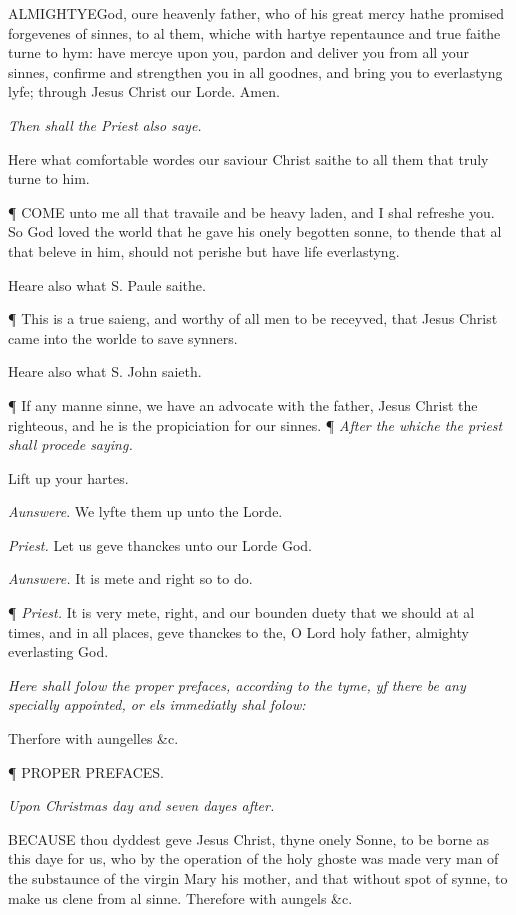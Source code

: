 ALMIGHTYE\textbf{}God, oure heavenly father, who of his great mercy hathe promised forgevenes
of sinnes, to al them, whiche with hartye repentaunce and true faithe
turne to hym: have mercye upon you, pardon and deliver you from all your
sinnes, confirme and strengthen you in all goodnes, and bring you to everlastyng
lyfe; through Jesus Christ our Lorde. Amen.

\emph{Then
shall the Priest also saye.}

Here what comfortable wordes our saviour Christ saithe to all them that
truly turne to him.

¶
COME
unto me all that travaile and be heavy laden, and I shal refreshe you.
So God loved the world that he gave his onely begotten sonne, to thende
that al that beleve in him, should not perishe but have life everlastyng.

Heare also what S. Paule saithe. 

¶ This is a true saieng, and worthy of all men to be
receyved, that Jesus Christ came into the worlde to save synners.

Heare also what S. John saieth.

¶ If any manne sinne, we have an advocate with the
father, Jesus Christ the righteous, and he is the propiciation for our
sinnes.
¶
\emph{After the whiche the priest shall procede saying.}

Lift up your hartes.

\emph{Aunswere}.
We lyfte them up unto the Lorde.

\emph{Priest.} Let us geve thanckes
unto our Lorde God.

\emph{Aunswere.} It is mete
and right so to do.

¶ \emph{Priest.} It is very
mete, right, and our bounden duety that we should at al times, and in
all places, geve thanckes to the, O Lord holy father, almighty everlasting
God.

\emph{Here
shall folow the proper prefaces, according to the tyme, yf there be any
specially appointed, or els immediatly shal folow:}

Therfore with aungelles \&c.

¶
PROPER PREFACES.

\emph{Upon
Christmas day and seven dayes after.}

BECAUSE
thou dyddest geve Jesus Christ, thyne onely Sonne, to be borne as this
daye for us, who by the operation of the holy ghoste was made very man
of the substaunce of the virgin Mary his mother, and that without spot
of synne, to make us clene from al sinne. Therefore with aungels \&c.

